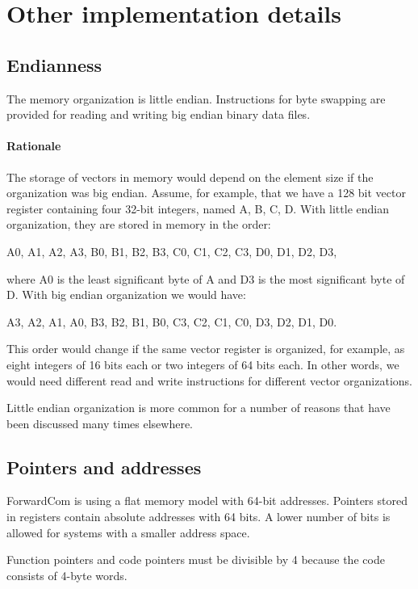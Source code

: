 \documentclass[forwardcom.tex]{subfiles}
\begin{document}
\RaggedRight


\chapter{Other implementation details}
\section{Endianness} \label{endianness}
The memory organization is little endian. Instructions for byte swapping are provided for reading and writing big endian binary data files.

\subsubsection{Rationale}
The storage of vectors in memory would depend on the element size if the organization was big endian. Assume, for example, that we have a 128 bit vector register containing four 32-bit integers, named A, B, C, D. With little endian organization, they are stored in memory in the order:
\vv

A0, A1, A2, A3, B0, B1, B2, B3, C0, C1, C2, C3, D0, D1, D2, D3,
\vv

where A0 is the least significant byte of A and D3 is the most significant byte of D. With big endian organization we would have:
\vv

A3, A2, A1, A0, B3, B2, B1, B0, C3, C2, C1, C0, D3, D2, D1, D0.
\vv

This order would change if the same vector register is organized, for example, as eight integers of 16 bits each or two integers of 64 bits each. In other words, we would need different read and write instructions for different vector organizations. 
\vv

Little endian organization is more common for a number of reasons that have been discussed many times elsewhere.
\vv


\section{Pointers and addresses} \label{PointersAndAddresses}
ForwardCom is using a flat memory model with 64-bit addresses.
Pointers stored in registers contain absolute addresses with 64 bits. A lower number of bits is allowed for systems with a smaller address space.
\vv

Function pointers and code pointers must be divisible by 4 because the code consists of 4-byte words.
\vv
\end{document}
